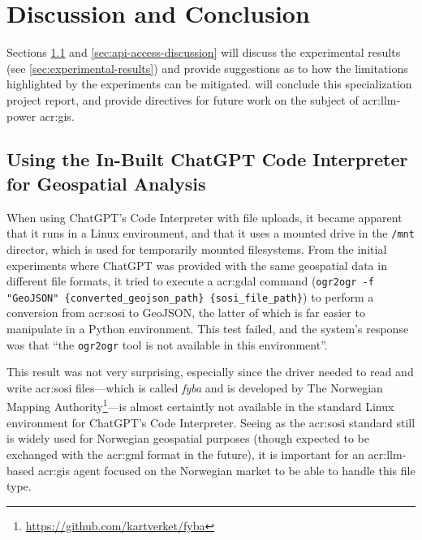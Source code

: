 \chapter{Discussion and Conclusion}\label{cha:discussion-and-conclusion}

Sections \ref{sec:code-interpreter-discussion} and \ref{sec:api-access-discussion} will discuss the experimental results (see \autoref{sec:experimental-results}) and provide suggestions as to how the limitations highlighted by the experiments can be mitigated.  will conclude this specialization project report, and provide directives for future work on the subject of \acrshort{acr:llm}-power \acrshort{acr:gis}.

\section{Using the In-Built ChatGPT Code Interpreter for Geospatial Analysis}\label{sec:code-interpreter-discussion}

When using ChatGPT's Code Interpreter with file uploads, it became apparent that it runs in a Linux environment, and that it uses a mounted drive  in the \texttt{/mnt} director, which is used for temporarily mounted filesystems. From the initial experiments where ChatGPT was provided with the same geospatial data in different file formats, it tried to execute a \acrshort{acr:gdal} command (\texttt{ogr2ogr -f "GeoJSON" \{converted\_geojson\_path\} \{sosi\_file\_path\}}) to perform a conversion from \acrshort{acr:sosi} to GeoJSON, the latter of which is far easier to manipulate in a Python environment. This test failed, and the system's response was that \enquote{the \texttt{ogr2ogr} tool is not available in this environment}.

This result was not very surprising, especially since the driver needed to read and write \acrshort{acr:sosi} files---which is called \textit{fyba} and is developed by The Norwegian Mapping Authority\footnote{\url{https://github.com/kartverket/fyba}}---is almost certaintly not available in the standard Linux environment for ChatGPT's Code Interpreter. Seeing as the \acrshort{acr:sosi} standard still is widely used for Norwegian geospatial purposes (though expected to be exchanged with the \acrshort{acr:gml} format in the future), it is important for an \acrshort{acr:llm}-based \acrshort{acr:gis} agent focused on the Norwegian market to be able to handle this file type.

